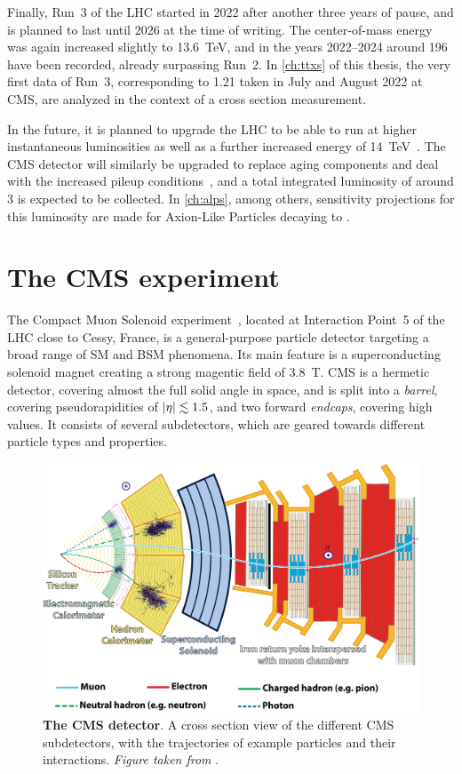 Finally, Run~3 of the LHC started in 2022 after another three years of pause, and is planned to last until 2026 at the time of writing. The center-of-mass energy was again increased slightly to 13.6~TeV, and in the years 2022--2024 around \SI{196}{\fbinv} have been recorded, already surpassing Run~2. In \cref{ch:ttxs} of this thesis, the very first data of Run~3, corresponding to \SI{1.21}{\fbinv} taken in July and August 2022 at CMS, are analyzed in the context of a \ttbar cross section measurement. 

In the future, it is planned to upgrade the LHC to be able to run at higher instantaneous luminosities as well as a further increased energy of 14~TeV~\cite{ZurbanoFernandez:2020cco}. The CMS detector will similarly be upgraded to replace aging components and deal with the increased pileup conditions~\cite{CMS:TDR-15-02,CMS:PRF-21-001}, and a total integrated luminosity of around \SI{3}{\abinv} is expected to be collected. In \cref{ch:alps}, among others, sensitivity projections for this luminosity are made for Axion-Like Particles decaying to \ttbar.

\section{The CMS experiment}
\label{sec:methods:cms}

The Compact Muon Solenoid experiment~\cite{CMS:2008xjf,CMS:PRF-21-001}, located at Interaction Point~5 of the LHC close to Cessy, France, is a general-purpose particle detector targeting a broad range of SM and BSM phenomena. Its main feature is a superconducting solenoid magnet creating a strong magentic field of 3.8~T. CMS is a hermetic detector, covering almost the full solid angle in space, and is split into a \textit{barrel}, covering pseudorapidities of $|\eta| \lesssim 1.5$, and two forward \textit{endcaps}, covering high \abseta values. It consists of several subdetectors, which are geared towards different particle types and properties.

\begin{figure}[!t]
    \centering
    \includegraphics[width=\textwidth]{figures/cms_slice.png}
    \caption{\textbf{The CMS detector}. A cross section view of the different CMS subdetectors, with the trajectories of example particles and their interactions. \textit{Figure taken from }.}
\end{figure}

